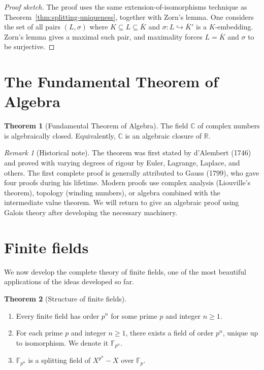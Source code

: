 \documentclass[12pt,a4paper,openany]{book}
\theoremstyle{definition}
\newtheorem{theorem}{Theorem}[chapter]
\theoremstyle{remark}
\newtheorem{remark}{Remark}[chapter]
\newcommand{\R}{\mathbb{R}}
\newcommand{\C}{\mathbb{C}}
\newcommand{\F}{\mathbb{F}}
\begin{document}
\begin{proof}[Proof sketch]
The proof uses the same extension-of-isomorphisms technique as
Theorem~\ref{thm:splitting-uniqueness}, together with Zorn's lemma.
One considers the set of all pairs $(L, \sigma)$ where $K \subseteq L
\subseteq \overline{K}$ and $\sigma \colon L \hookrightarrow
\overline{K}'$ is a $K$-embedding. Zorn's lemma gives a maximal such
pair, and maximality forces $L = \overline{K}$ and $\sigma$ to be
surjective.
\end{proof}

\section{The Fundamental Theorem of Algebra}
\label{sec:FTA}

\begin{theorem}[Fundamental Theorem of Algebra]
\label{thm:FTA}
The field $\C$ of complex numbers is algebraically closed.
Equivalently, $\C$ is an algebraic closure of $\R$.
\end{theorem}

\begin{remark}[Historical note]
\label{rem:FTA-history}
The theorem was first stated by d'Alembert (1746)
and proved with varying degrees of rigour by Euler, Lagrange, Laplace,
and others. The first complete proof is generally attributed to
Gauss (1799), who gave four proofs during his lifetime.
Modern proofs use complex analysis (Liouville's theorem), topology
(winding numbers), or algebra combined with the intermediate value
theorem. We will return to give an algebraic proof using Galois theory
after developing the necessary machinery.
\end{remark}

\section{Finite fields}
\label{sec:finite-fields}

We now develop the complete theory of finite fields, one of the most
beautiful applications of the ideas developed so far.

\begin{theorem}[Structure of finite fields]
\label{thm:finite-field-structure}
\begin{enumerate}[label=(\roman*)]
  \item Every finite field has order $p^n$ for some prime $p$ and
    integer $n \ge 1$.
  \item For each prime $p$ and integer $n \ge 1$, there exists a
    field of order $p^n$, unique up to isomorphism. We denote it
    $\F_{p^n}$.
  \item $\F_{p^n}$ is a splitting field of $X^{p^n} - X$ over $\F_p$.
\end{enumerate}
\end{theorem}
\end{document}
